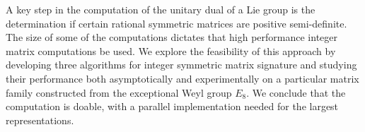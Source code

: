 A key step in the computation of the unitary dual of a Lie group is
the determination if certain rational symmetric matrices are positive
semi-definite. The size of some of the computations dictates that high
performance integer matrix computations be used.  We explore the
feasibility of this approach by developing three algorithms for
integer symmetric matrix signature and studying their performance both
asymptotically and experimentally on a particular matrix family
constructed from the exceptional Weyl group $E_8$.  We conclude that the
computation is doable, with a parallel implementation needed for the
largest representations.

